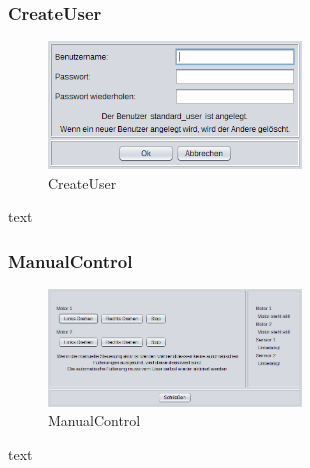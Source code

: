 \subsubsection{CreateUser}
\begin{figure}
\vspace{-20pt}
  \begin{center}
    \includegraphics[width=0.60\textwidth]{Bilder/GUI/CreateUser}
  \end{center}
  \caption{CreateUser}
  \label{CreateUser}
  \vspace{-40pt}
\end{figure}
text

\newpage

\subsubsection{ManualControl}
\begin{figure}
\vspace{-20pt}
  \begin{center}
    \includegraphics[width=0.60\textwidth]{Bilder/GUI/ManualControl}
  \end{center}
  \caption{ManualControl}
  \label{ManualControl}
  \vspace{-40pt}
\end{figure}
text

